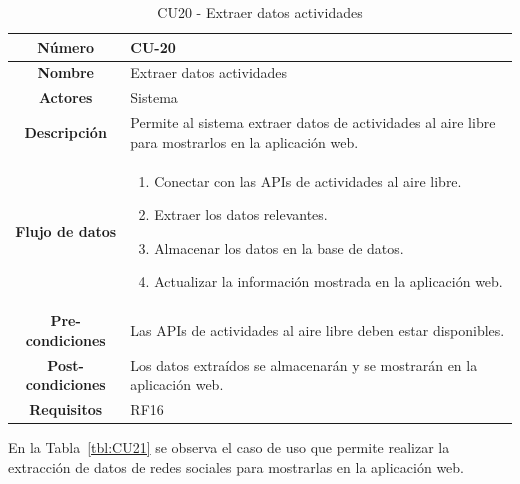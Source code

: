 \begin{table}[h!tb]
	\centering
	\begin{adjustbox}{width=1\textwidth}
	\begin{tabular}{|c|p{\textwidth}|}
		\hline {\bf Número} & CU-20 \\
		\hline {\bf Nombre} & Extraer datos actividades\\
		\hline {\bf Actores} & Sistema \\ 
		\hline {\bf Descripción} & Permite al sistema extraer datos de actividades al aire libre para mostrarlos en la aplicación web. \\ 
		\hline {\bf Flujo de datos}
		& 
		\begin{enumerate}
			\item Conectar con las APIs de actividades al aire libre.
			\item Extraer los datos relevantes.
			\item Almacenar los datos en la base de datos.
			\item Actualizar la información mostrada en la aplicación web.
		\end{enumerate}\\
		\hline {\bf Pre-condiciones}
		& Las APIs de actividades al aire libre deben estar disponibles. \\ 
		\hline {\bf Post-condiciones}
		& Los datos extraídos se almacenarán y se mostrarán en la aplicación web. \\ 
		\hline {\bf Requisitos} & RF16 \\ 
		\hline 
	\end{tabular}
	\end{adjustbox}
	\caption{CU20 - Extraer datos actividades \label{tbl:CU20}}
\end{table}
En la Tabla~\ref{tbl:CU21} se observa el caso de uso que permite realizar la extracción de datos de redes sociales para mostrarlas en la aplicación web.
